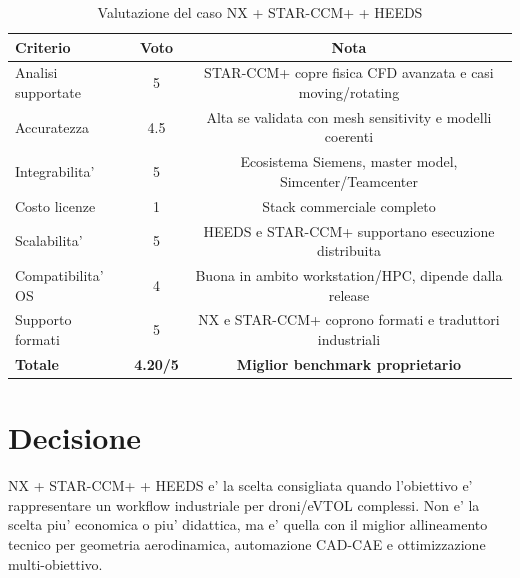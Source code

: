 \begin{table}[H]
\centering
\caption{Valutazione del caso NX + STAR-CCM+ + HEEDS}
\begin{tabular}{P{5cm} c c}
\toprule
\textbf{Criterio} & \textbf{Voto} & \textbf{Nota} \\
\midrule
Analisi supportate & 5 & STAR-CCM+ copre fisica CFD avanzata e casi moving/rotating \\
Accuratezza & 4.5 & Alta se validata con mesh sensitivity e modelli coerenti \\
Integrabilita' & 5 & Ecosistema Siemens, master model, Simcenter/Teamcenter \\
Costo licenze & 1 & Stack commerciale completo \\
Scalabilita' & 5 & HEEDS e STAR-CCM+ supportano esecuzione distribuita \\
Compatibilita' OS & 4 & Buona in ambito workstation/HPC, dipende dalla release \\
Supporto formati & 5 & NX e STAR-CCM+ coprono formati e traduttori industriali \\
\midrule
\textbf{Totale} & \textbf{4.20/5} & \textbf{Miglior benchmark proprietario} \\
\bottomrule
\end{tabular}
\end{table}

\section{Decisione}

NX + STAR-CCM+ + HEEDS e' la scelta consigliata quando l'obiettivo e' rappresentare un workflow industriale per droni/eVTOL complessi. Non e' la scelta piu' economica o piu' didattica, ma e' quella con il miglior allineamento tecnico per geometria aerodinamica, automazione CAD-CAE e ottimizzazione multi-obiettivo.
